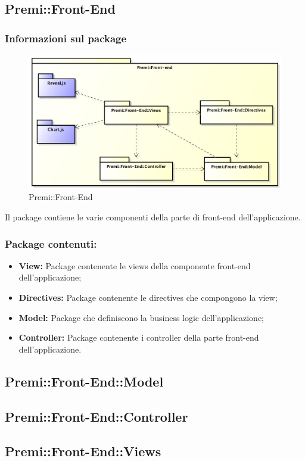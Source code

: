 \subsection{Premi::Front-End}
	\subsubsection*{Informazioni sul package}
		\begin{figure}[h]
			\centering
			\includegraphics[width=\linewidth]{img/front-end_package}
			\caption[Premi::Front-End]{Premi::Front-End}
		\end{figure}
		Il package contiene le varie componenti della parte di front-end dell'applicazione.

		\subsubsection*{Package contenuti:}
			\begin{itemize}
				\item \textbf{View:} Package contenente le views della componente front-end dell'applicazione;
				\item \textbf{Directives:} Package contenente le directives che compongono la view;
				\item \textbf{Model:} Package che definiscono la business logic dell'applicazione;
				\item \textbf{Controller:} Package contenente i controller della parte front-end dell'applicazione.
			\end{itemize}

		\subsection{Premi::Front-End::Model}
			

		\subsection{Premi::Front-End::Controller}
			

		\subsection{Premi::Front-End::Views}
			

